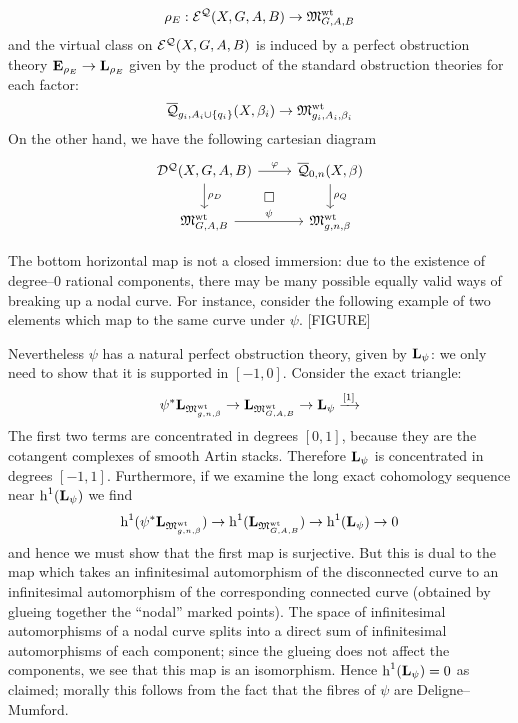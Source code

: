 \begin{equation*} \rho_E : \mathcal{E^Q}(X,G,A,B) \rightarrow \mathfrak M_{G,A,B}^{\operatorname{wt}} \end{equation*}
and the virtual class on $\mathcal{E^Q}(X,G,A,B)$ is induced by a perfect obstruction theory $\mathbf{E}_{\rho_E} \rightarrow \mathbf{L}_{\rho_E}$ given by the product of the standard obstruction theories for each factor:
\begin{equation*} \overline{\mathcal Q}_{g_i,A_i\cup\{q_i\}}(X,\beta_i)\rightarrow \mathfrak M_{g_i,A_i,\beta_i}^{\operatorname{wt}} \end{equation*}
On the other hand, we have the following cartesian diagram
\begin{equation} \label{Full quasimap diagram}
\begin{tikzcd}
\D{X}{G,A}{B} \ar[r,"\varphi"] \ar[d,"\rho_D"] \ar[rd,phantom,"\square"] & \Q{0}{n}{X}{\beta} \ar[d,"\rho_Q"] \\
\MM_{G,A,B}^{\operatorname{wt}} \ar[r,"\psi"] & \MM_{g,n,\beta}^{\operatorname{wt}}
\end{tikzcd}
\end{equation}

The bottom horizontal map is not a closed immersion: due to the existence of degree--$0$ rational components, there may be many possible equally valid ways of breaking up a nodal curve. For instance, consider the following example of two elements which map to the same curve under $\psi$.
[FIGURE]

Nevertheless $\psi$ has a natural perfect obstruction theory, given by $\mathbf{L}_{\psi}$: we only need to show that it is supported in $[-1,0]$. Consider the exact triangle:
\begin{equation*} \psi^* \mathbf{L}_{\mathfrak M_{g,n,\beta}^{\operatorname{wt}}} \rightarrow \mathbf{L}_{\mathfrak M_{G,A,B}^{\operatorname{wt}}} \rightarrow \mathbf{L}_\psi \xrightarrow{[1]} \end{equation*}
The first two terms are concentrated in degrees $[0,1]$, because they are the cotangent complexes of smooth Artin stacks. Therefore $\mathbf{L}_\psi$ is concentrated in degrees $[-1,1]$. Furthermore, if we examine the long exact cohomology sequence near $\operatorname{h}^1(\mathbf{L}_\psi)$ we find
\begin{equation*} \operatorname{h}^1(\psi^* \mathbf{L}_{\mathfrak M_{g,n,\beta}^{\operatorname{wt}}}) \rightarrow \operatorname{h}^1(\mathbf{L}_{\mathfrak M_{G,A,B}^{\operatorname{wt}}}) \rightarrow \operatorname{h}^1(\mathbf{L}_\psi) \rightarrow 0 \end{equation*}
and hence we must show that the first map is surjective. But this is dual to the map which takes an infinitesimal automorphism of the disconnected curve to an infinitesimal automorphism of the corresponding connected curve (obtained by glueing together the ``nodal'' marked points). The space of infinitesimal automorphisms of a nodal curve splits into a direct sum of infinitesimal automorphisms of each component; since the glueing does not affect the components, we see that this map is an isomorphism. Hence $\operatorname{h}^1(\mathbf{L}_\psi) = 0$ as claimed; morally this follows from the fact that the fibres of $\psi$ are Deligne--Mumford.

